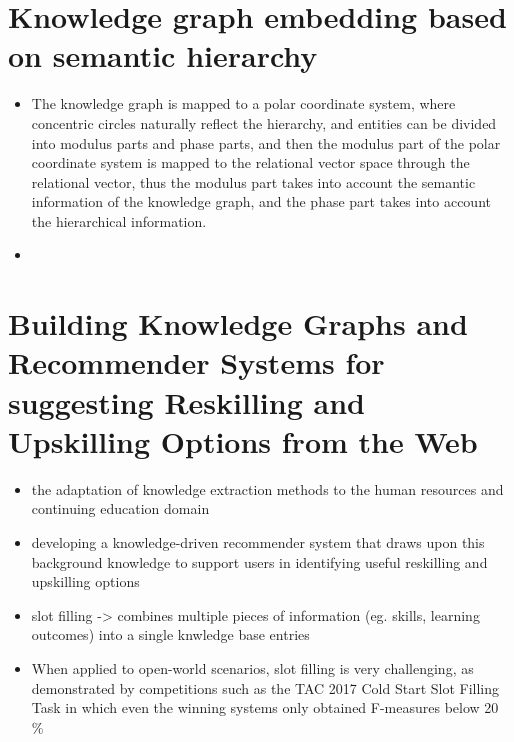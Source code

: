 \documentclass{report}
\begin{document}
\section{Knowledge graph embedding based on semantic hierarchy}
\begin{itemize}
    \item The knowledge graph is mapped to a polar coordinate system, where concentric circles naturally reflect the hierarchy, and entities can be divided into modulus parts and phase parts, and then the modulus part of the polar coordinate system is mapped to the relational vector space through the relational vector, thus the modulus part takes into account the semantic information of the knowledge graph, and the phase part takes into account the hierarchical information.
    \item 
\end{itemize}

\section{Building Knowledge Graphs and Recommender Systems for suggesting Reskilling and Upskilling Options from the Web}
\begin{itemize}
    \item the adaptation of knowledge extraction methods to the human resources and continuing education domain
    \item developing a knowledge-driven recommender system that draws upon this background knowledge to support users in identifying useful reskilling and upskilling options
    \item slot filling -> combines multiple pieces of information (eg. skills, learning outcomes) into a single knwledge base entries
    \item When applied to open-world scenarios, slot
    filling is very challenging, as demonstrated by competitions such as the TAC 2017 Cold Start Slot Filling Task in which even the winning systems only obtained F-measures below 20 \% 
\end{itemize}
\end{document}
